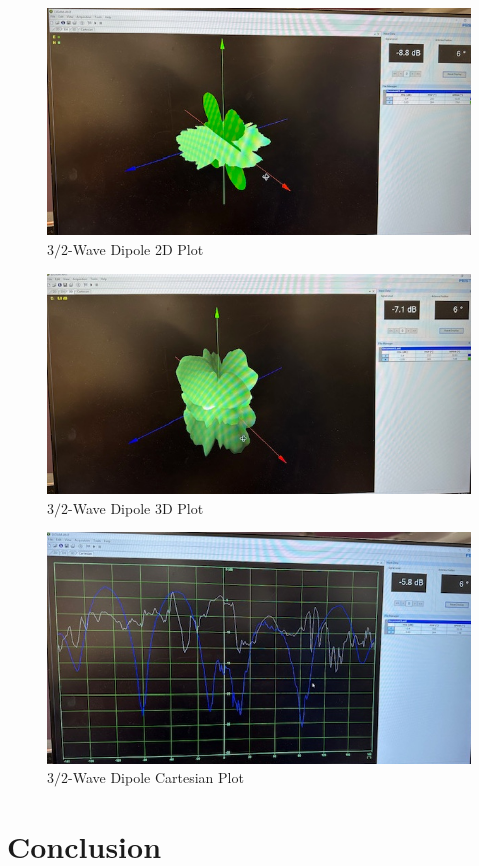 \documentclass[
	letterpaper, %
	10pt, %
]{CSUniSchoolLabReport}
\begin{document}
\begin{figure}[H]
  \centering
  \includegraphics[width=.8\textwidth]{Figures/Lab Five/3-2WD-2D.jpg}
  \caption{$3/2$-Wave Dipole 2D Plot}
  \label{fig:10}
\end{figure}

\begin{figure}[H]
  \centering
  \includegraphics[width=.8\textwidth]{Figures/Lab Five/3-2WD-3D.jpg}
  \caption{$3/2$-Wave Dipole 3D Plot}
  \label{fig:11}
\end{figure}

\begin{figure}[H]
  \centering
  \includegraphics[width=.8\textwidth]{Figures/Lab Five/3-2WD-XY.jpg}
  \caption{$3/2$-Wave Dipole Cartesian Plot}
  \label{fig:12}
\end{figure}

\section{Conclusion}
\end{document}

